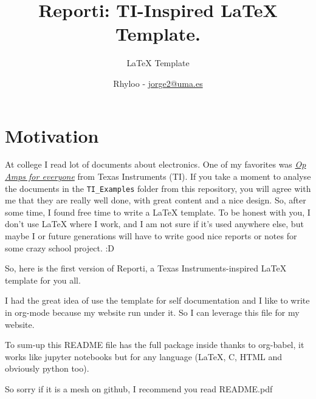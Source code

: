 \documentclass[english]{reporti}
\date{}
\title{Reporti: TI-Inspired \LaTeX{} Template.}
\begin{document}
\subtitle{LaTeX Template}
\author{Rhyloo - \href{mailto:jorge2@uma.es}{jorge2@uma.es}}




\cover[width=1.35\textwidth][next]

\section{Motivation}
\label{sec:org2f4b1b6}
At college I read lot of documents about electronics. One of my favorites was \emph{\href{https://e2echina.ti.com/cfs-file/\_\_key/telligent-evolution-components-attachments/00-52-01-00-00-04-59-46/OP-amp-for-everyone.pdf}{Op Amps for everyone}} from Texas Instruments (TI). If you take a moment to analyse the documents in the \texttt{TI\_Examples} folder from this repository, you will agree with me that they are really well done, with great content and a nice design. So, after some time, I found free time to write a \LaTeX{} template. To be honest with you, I don't use \LaTeX{} where I work, and I am not sure if it's used anywhere else, but maybe I or future generations will have to write good nice reports or notes for some crazy school project. :D

So, here is the first version of Reporti, a Texas Instruments-inspired \LaTeX{} template for you all.

\begin{tcolorbox}[colback=yellow!5!white,colframe=red,title=Warning, fonttitle=\Large\bfseries,
  fontupper=\noindent,boxsep=2pt,enhanced,left=10pt,top=5pt, bottom=5pt,right=10pt]
  
I had the great idea of use the template for self documentation and I like to write in org-mode because my website run under it. So I can leverage this file for my website.

To sum‐up this README file has the full package inside thanks to org-babel, it works like jupyter notebooks but for any language (LaTeX, C, HTML and obviously python too).

So sorry if it is a mesh on github, I recommend you read README.pdf
\end{tcolorbox}
\end{document}
